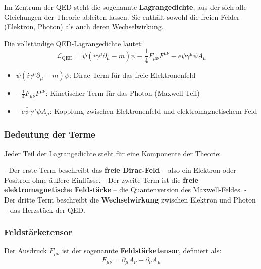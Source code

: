Im Zentrum der QED steht die sogenannte \textbf{Lagrangedichte}, aus der sich alle Gleichungen der Theorie ableiten lassen. Sie enthält sowohl die freien Felder (Elektron, Photon) als auch deren Wechselwirkung.

Die vollständige QED-Lagrangedichte lautet:
\[
\mathcal{L}_{\text{QED}} = \bar{\psi}(i \gamma^\mu \partial_\mu - m)\psi - \frac{1}{4}F_{\mu\nu}F^{\mu\nu} - e \bar{\psi} \gamma^\mu \psi A_\mu
\]

\begin{tcolorbox}[mathebox, title=Aufbau der QED-Lagrangedichte]
	\label{box:Sufbau der QED-Langrangedichte}
	\begin{itemize}
		\item $\bar{\psi}(i \gamma^\mu \partial_\mu - m)\psi$: Dirac-Term für das freie Elektronenfeld
		\item $-\frac{1}{4}F_{\mu\nu}F^{\mu\nu}$: Kinetischer Term für das Photon (Maxwell-Teil)
		\item $-e \bar{\psi} \gamma^\mu \psi A_\mu$: Kopplung zwischen Elektronenfeld und elektromagnetischem Feld
	\end{itemize}
\end{tcolorbox}

\subsubsection*{Bedeutung der Terme}
Jeder Teil der Lagrangedichte steht für eine Komponente der Theorie:

- Der erste Term beschreibt das \textbf{freie Dirac-Feld} – also ein Elektron oder Positron ohne äußere Einflüsse.
- Der zweite Term ist die \textbf{freie elektromagnetische Feldstärke} – die Quantenversion des Maxwell-Feldes.
- Der dritte Term beschreibt die \textbf{Wechselwirkung} zwischen Elektron und Photon – das Herzstück der QED.

\subsubsection*{Feldstärketensor}
Der Ausdruck $F_{\mu\nu}$ ist der sogenannte \textbf{Feldstärketensor}, definiert als:
\[
F_{\mu\nu} = \partial_\mu A_\nu - \partial_\nu A_\mu
\]


